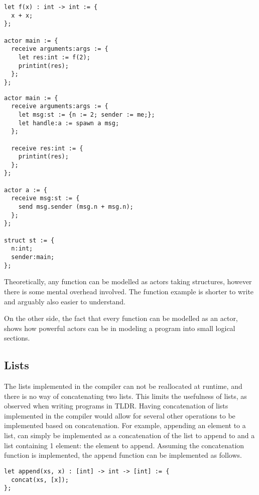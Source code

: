 \begin{lstlisting}[style=TLDR, caption = {Simple example using a function.}]
let f(x) : int -> int := {
  x + x;
};

actor main := {
  receive arguments:args := {
    let res:int := f(2);
    printint(res);
  };
};
\end{lstlisting}
\begin{lstlisting}[style=TLDR, caption = {Example of modeling a function taking a int and returning the int squared, as an actor.}]
actor main := {
  receive arguments:args := {
    let msg:st := {n := 2; sender := me;};
    let handle:a := spawn a msg;
  };
  
  receive res:int := {
    printint(res);
  };
};

actor a := {
  receive msg:st := {
    send msg.sender (msg.n + msg.n);
  };
};

struct st := {
  n:int;
  sender:main;
};
\end{lstlisting}

Theoretically, any function can be modelled as actors taking structures, however there is some mental overhead involved. The function example is shorter to write and arguably also easier to understand.

On the other side, the fact that every function can be modelled as an actor, shows how powerful actors can be in modeling a program into small logical sections.

\subsection{Lists}

The lists implemented in the compiler can not be reallocated at runtime, and there is no way of concatenating two lists. This limits the usefulness of lists, as observed when writing programs in TLDR. Having concatenation of lists implemented in the compiler would allow for several other operations to be implemented based on concatenation. For example, appending an element to a list, can simply be implemented as a concatenation of the list to append to and a list containing 1 element: the element to append. Assuming the concatenation function is implemented, the append function can be implemented as follows.

\begin{lstlisting}[caption = {Implementation of the append function based on the concatenation function.}]
let append(xs, x) : [int] -> int -> [int] := {
  concat(xs, [x]);
};
\end{lstlisting}

